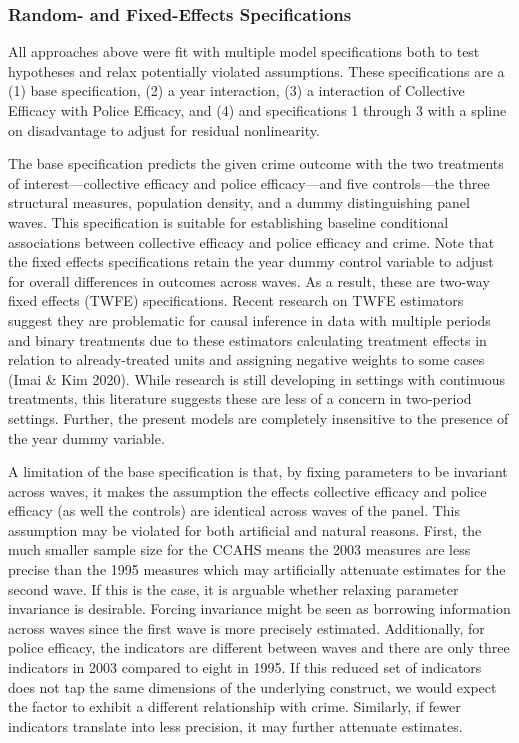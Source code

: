 \documentclass [11pt, proquest] {uwthesis}[2015/03/03]
\begin{document}
\hypertarget{random--and-fixed-effects-specifications}{%
\subsubsection{Random- and Fixed-Effects Specifications}\label{random--and-fixed-effects-specifications}}

All approaches above were fit with multiple model specifications both to test hypotheses and relax potentially violated assumptions. These specifications are a (1) base specification, (2) a year interaction, (3) a interaction of Collective Efficacy with Police Efficacy, and (4) and specifications 1 through 3 with a spline on disadvantage to adjust for residual nonlinearity.

The base specification predicts the given crime outcome with the two treatments of interest---collective efficacy and police efficacy---and five controls---the three structural measures, population density, and a dummy distinguishing panel waves. This specification is suitable for establishing baseline conditional associations between collective efficacy and police efficacy and crime. Note that the fixed effects specifications retain the year dummy control variable to adjust for overall differences in outcomes across waves. As a result, these are two-way fixed effects (TWFE) specifications. Recent research on TWFE estimators suggest they are problematic for causal inference in data with multiple periods and binary treatments due to these estimators calculating treatment effects in relation to already-treated units and assigning negative weights to some cases (Imai \& Kim 2020). While research is still developing in settings with continuous treatments, this literature suggests these are less of a concern in two-period settings. Further, the present models are completely insensitive to the presence of the year dummy variable.

A limitation of the base specification is that, by fixing parameters to be invariant across waves, it makes the assumption the effects collective efficacy and police efficacy (as well the controls) are identical across waves of the panel. This assumption may be violated for both artificial and natural reasons. First, the much smaller sample size for the CCAHS means the 2003 measures are less precise than the 1995 measures which may artificially attenuate estimates for the second wave. If this is the case, it is arguable whether relaxing parameter invariance is desirable. Forcing invariance might be seen as borrowing information across waves since the first wave is more precisely estimated. Additionally, for police efficacy, the indicators are different between waves and there are only three indicators in 2003 compared to eight in 1995. If this reduced set of indicators does not tap the same dimensions of the underlying construct, we would expect the factor to exhibit a different relationship with crime. Similarly, if fewer indicators translate into less precision, it may further attenuate estimates.
\end{document}
